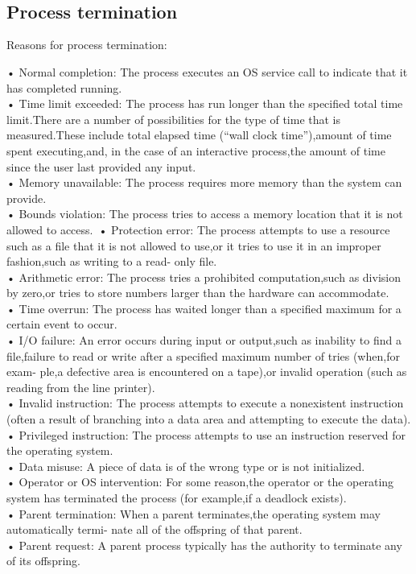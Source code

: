 \\
\\

\subsection{Process termination}

Reasons for process termination:\

• Normal completion: The process executes an OS service call to indicate that it has completed
running.\\
• Time limit exceeded: The process has run longer than the specified total time limit.There are a
number of possibilities for the type of time that is measured.These include
total elapsed time (“wall clock time”),amount of time spent executing,and,
in the case of an interactive process,the amount of time since the user last
provided any input.\\
• Memory unavailable: The process requires more memory than the system can provide.\\
• Bounds violation: The process tries to access a memory location that it is not allowed to access.\
• Protection error: The process attempts to use a resource such as a file that it is not allowed
to use,or it tries to use it in an improper fashion,such as writing to a read-
only file.\\
• Arithmetic error: The process tries a prohibited computation,such as division by zero,or tries
to store numbers larger than the hardware can accommodate.\\
• Time overrun: The process has waited longer than a specified maximum for a certain event
to occur.\\
• I/O failure: An error occurs during input or output,such as inability to find a file,failure
to read or write after a specified maximum number of tries (when,for exam-
ple,a defective area is encountered on a tape),or invalid operation (such as
reading from the line printer).\\
• Invalid instruction: The process attempts to execute a nonexistent instruction (often a result of
branching into a data area and attempting to execute the data).\\
• Privileged instruction: The process attempts to use an instruction reserved for the operating system.\\
• Data misuse: A piece of data is of the wrong type or is not initialized.\\
• Operator or OS intervention: For some reason,the operator or the operating system has terminated the
process (for example,if a deadlock exists).\\
• Parent termination: When a parent terminates,the operating system may automatically termi-
nate all of the offspring of that parent.\\
• Parent request: A parent process typically has the authority to terminate any of its offspring.\\


